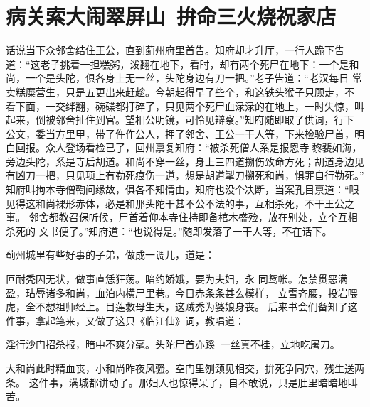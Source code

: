 \chapter{病关索大闹翠屏山~拚命三火烧祝家店}

话说当下众邻舍结住王公，直到蓟州府里首告。知府却才升厅，一行人跪下告
道：“这老子挑着一担糕粥，泼翻在地下，看时，却有两个死尸在地下：一个是和
尚，一个是头陀，俱各身上无一丝，头陀身边有刀一把。”老子告道：“老汉每日
常卖糕糜营生，只是五更出来赶趁。今朝起得早了些个，和这铁头猴子只顾走，不
看下面，一交绊翻，碗碟都打碎了，只见两个死尸血渌渌的在地上，一时失惊，叫
起来，倒被邻舍扯住到官。望相公明镜，可怜见辩察。”知府随即取了供词，行下
公文，委当方里甲，带了仵作公人，押了邻舍、王公一干人等，下来检验尸首，明
白回报。众人登场看检已了，回州禀复知府：“被杀死僧人系是报恩寺黎裴如海，
旁边头陀，系是寺后胡道。和尚不穿一丝，身上三四道搠伤致命方死；胡道身边见
有凶刀一把，只见项上有勒死痕伤一道，想是胡道掣刀搠死和尚，惧罪自行勒死。”
知府叫拘本寺僧鞫问缘故，俱各不知情由，知府也没个决断，当案孔目禀道：“眼
见得这和尚裸形赤体，必是和那头陀干甚不公不法的事，互相杀死，不干王公之事。
邻舍都教召保听候，尸首着仰本寺住持即备棺木盛殓，放在别处，立个互相杀死的
文书便了。”知府道：“也说得是。”随即发落了一干人等，不在话下。

蓟州城里有些好事的子弟，做成一调儿，道是：

叵耐秃囚无状，做事直恁狂荡。暗约娇娥，要为夫妇，永
同鸳帐。怎禁贯恶满盈，玷辱诸多和尚，血泊内横尸里巷。今日赤条条甚么模样，
立雪齐腰，投岩喂虎，全不想祖师经上。目莲救母生天，这贼秃为婆娘身丧。
后来书会们备知了这件事，拿起笔来，又做了这只《临江仙》词，教唱道：

淫行沙门招杀报，暗中不爽分毫。头陀尸首亦蹊，一丝真不挂，立地吃屠刀。

大和尚此时精血丧，小和尚昨夜风骚。空门里刎颈见相交，拚死争同穴，残生送两
条。
这件事，满城都讲动了。那妇人也惊得呆了，自不敢说，只是肚里暗暗地叫苦。

